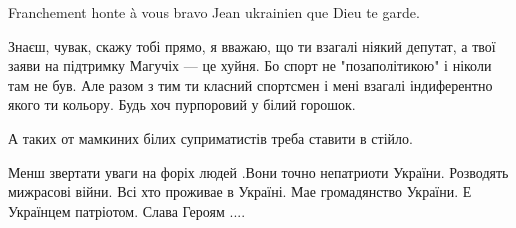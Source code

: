 \begin{itemize}
 
Franchement honte à vous bravo Jean ukrainien que Dieu te garde.

 

Знаєш, чувак, скажу тобі прямо, я вважаю, що ти взагалі ніякий депутат, а твої
заяви на підтримку Магучіх — це хуйня. Бо спорт не "позаполітикою" і ніколи там
не був. Але разом з тим ти класний спортсмен і мені взагалі індиферентно якого
ти кольору. Будь хоч пурпоровий у білий горошок.

А таких от мамкиних білих суприматистів треба ставити в стійло.


 

Менш звертати уваги на форіх людей .Вони точно непатриоти України. Розводять
мижрасові війни. Всі хто проживае в Україні. Мае громадянство України. Е Українцем
патріотом. Слава Героям ....

\end{itemize}

